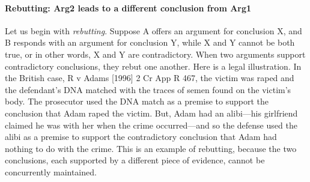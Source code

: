 \documentclass[10pt]{article}
\begin{document}
\paragraph{Rebutting: Arg2 leads to a different conclusion from Arg1}
		
		
Let us begin with \textit{rebutting}. Suppose A offers an argument for conclusion X, and B responds with an argument 
for conclusion Y, while X and Y cannot be both true, or in other words, X and Y are contradictory.  When two arguments support contradictory 
conclusions, they rebut one another. Here is a legal illustration. 
In the British case, R v Adams [1996] 2 Cr App R 467, the victim was raped and the defendant's DNA 
matched with the traces of semen found on the victim's body. %
The prosecutor used the DNA match as a premise to support the conclusion that Adam raped the victim. But, Adam had an alibi---his girlfriend claimed he was with her when the crime 
occurred---and so the defense used the alibi as a premise to support the contradictory conclusion 
that Adam had nothing to do with the crime. This is an example of rebutting, because the two conclusions, each supported 
by a different piece of evidence, cannot be concurrently maintained. 


\end{document}
